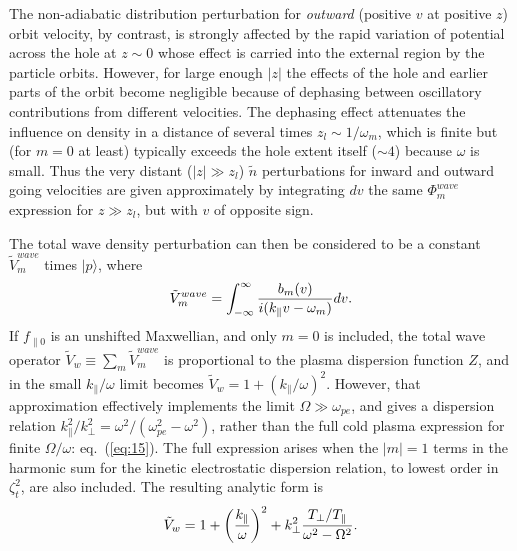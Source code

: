 \documentclass[12pt]{article}
\def\ket#1{|#1\rangle}
\begin{document}
The non-adiabatic distribution perturbation for \emph{outward}
(positive $v$ at positive $z$) orbit velocity, by contrast, is
strongly affected by the rapid variation of potential across the hole
at $z\sim 0$ whose effect is carried into the external region by the
particle orbits. However, for large enough $|z|$ the effects of the
hole and earlier parts of the orbit become negligible because of
dephasing between oscillatory contributions from different
velocities. The dephasing effect attenuates the influence on density
in a distance of several times $z_l\sim 1/\omega_m$, which is finite
but (for $m=0$ at least) typically exceeds the hole extent itself
($\sim 4$) because $\omega$ is small.  Thus the very distant
($|z|\gg z_l$) $\tilde n$ perturbations for inward and outward going
velocities are given approximately by integrating $dv$ the same
$\Phi_m^{wave}$ expression for $z\gg z_l$, but with $v$ of opposite
sign.

The total wave density perturbation can then be considered to be a
constant $\tilde V_m^{wave}$ times $\ket{p}$, where
\begin{equation}
  \label{vmwave}
  \tilde V_m^{wave}= \int_{-\infty}^\infty { b_m(v) \over
    i(k_\parallel v-\omega_m)} dv.
\end{equation}
If $f_{\parallel0}$ is an unshifted Maxwellian, and only $m=0$ is
included, the total wave operator
$\tilde V_w\equiv \sum_m\tilde V_m^{wave}$ is proportional to the
plasma dispersion function $Z$, and in the small $k_\parallel/\omega$
limit becomes $\tilde V_w=1+(k_\parallel/\omega)^2$.  However, that
approximation effectively implements the limit
$\Omega\gg \omega_{pe}$, and gives a dispersion relation
$k_\parallel^2/k_\perp^2 = \omega^2/(\omega_{pe}^2-\omega^2)$, rather
than the full cold plasma expression for finite $\Omega/\omega$: eq.\
(\ref{eq:15}). The full expression arises when the $|m|=1$ terms in
the harmonic sum for the kinetic electrostatic dispersion
relation\cite[see, e.g.][section 4.4.]{Swanson1989}, to lowest
order in $\zeta_t^2$, are also included. The resulting analytic form
is
\begin{equation}
  \label{eq:24}
  \tilde V_w= 1 + \left(k_\parallel\over\omega\right)^2 +
  k_\perp^2 {T_\perp/T_\parallel\over\omega^2-\Omega^2}.
\end{equation}
\end{document}
